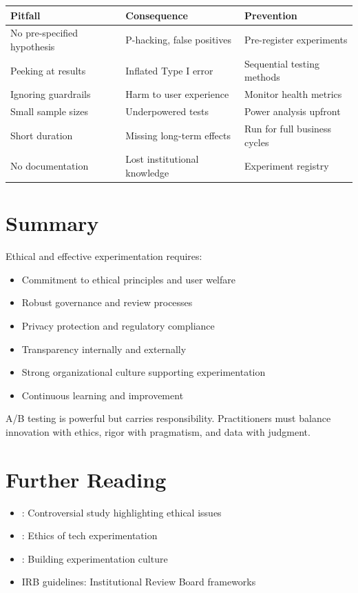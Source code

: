\begin{center}
\begin{tabular}{lp{5cm}p{5cm}}
\toprule
\textbf{Pitfall} & \textbf{Consequence} & \textbf{Prevention} \\
\midrule
No pre-specified hypothesis & P-hacking, false positives & Pre-register experiments \\
Peeking at results & Inflated Type I error & Sequential testing methods \\
Ignoring guardrails & Harm to user experience & Monitor health metrics \\
Small sample sizes & Underpowered tests & Power analysis upfront \\
Short duration & Missing long-term effects & Run for full business cycles \\
No documentation & Lost institutional knowledge & Experiment registry \\
\bottomrule
\end{tabular}
\end{center}

\section{Summary}

Ethical and effective experimentation requires:

\begin{itemize}
    \item Commitment to ethical principles and user welfare
    \item Robust governance and review processes
    \item Privacy protection and regulatory compliance
    \item Transparency internally and externally
    \item Strong organizational culture supporting experimentation
    \item Continuous learning and improvement
\end{itemize}

A/B testing is powerful but carries responsibility. Practitioners must balance innovation with ethics, rigor with pragmatism, and data with judgment.

\section{Further Reading}

\begin{itemize}
    \item \cite{facebook2014emotional}: Controversial study highlighting ethical issues
    \item \cite{meyer2014everything}: Ethics of tech experimentation
    \item \cite{kohavi2020trustworthy}: Building experimentation culture
    \item IRB guidelines: Institutional Review Board frameworks
\end{itemize}

